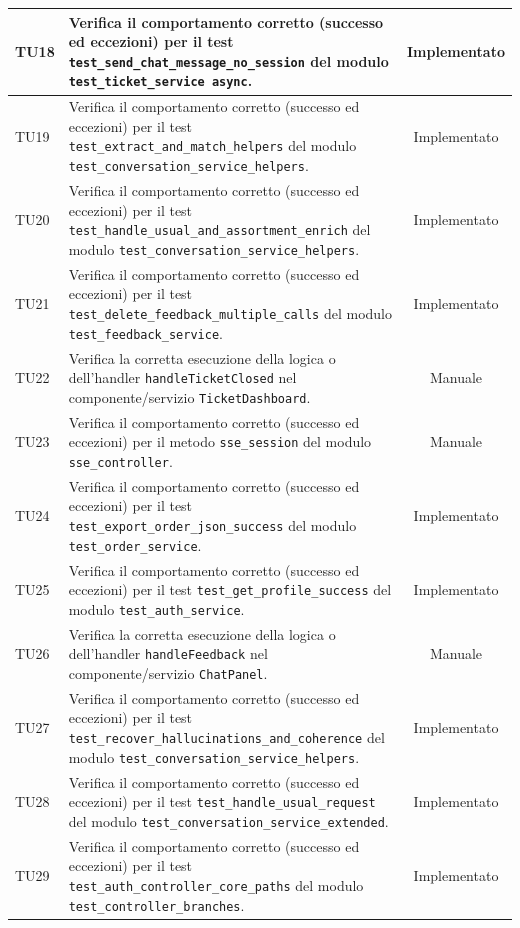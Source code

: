 \documentclass[a4paper,11pt,oneside]{scrartcl}
\begin{document}
\begin{longtable}{|p{1.9cm}|p{11.6cm}|c|}
    TU18 & Verifica il comportamento corretto (successo ed eccezioni) per il test \texttt{test\_send\_chat\_message\_no\_session} del modulo \texttt{test\_ticket\_service     async}. & Implementato \\ \hline
    TU19 & Verifica il comportamento corretto (successo ed eccezioni) per il test \texttt{test\_extract\_and\_match\_helpers} del modulo \texttt{test\_conversation\_service\_helpers}. & Implementato \\ \hline
    TU20 & Verifica il comportamento corretto (successo ed eccezioni) per il test \texttt{test\_handle\_usual\_and\_assortment\_enrich} del modulo \texttt{test\_conversation\_service\_helpers}. & Implementato \\ \hline
    TU21 & Verifica il comportamento corretto (successo ed eccezioni) per il test \texttt{test\_delete\_feedback\_multiple\_calls} del modulo \texttt{test\_feedback\_service}. & Implementato \\ \hline
    TU22 & Verifica la corretta esecuzione della logica o dell'handler \texttt{handleTicketClosed} nel componente/servizio \texttt{TicketDashboard}. & Manuale \\ \hline
    TU23 & Verifica il comportamento corretto (successo ed eccezioni) per il metodo \texttt{sse\_session} del modulo \texttt{sse\_controller}. & Manuale \\ \hline
    TU24 & Verifica il comportamento corretto (successo ed eccezioni) per il test \texttt{test\_export\_order\_json\_success} del modulo \texttt{test\_order\_service}. & Implementato \\ \hline
    TU25 & Verifica il comportamento corretto (successo ed eccezioni) per il test \texttt{test\_get\_profile\_success} del modulo \texttt{test\_auth\_service}. & Implementato \\ \hline
    TU26 & Verifica la corretta esecuzione della logica o dell'handler \texttt{handleFeedback} nel componente/servizio \texttt{ChatPanel}. & Manuale \\ \hline
    TU27 & Verifica il comportamento corretto (successo ed eccezioni) per il test \texttt{test\_recover\_hallucinations\_and\_coherence} del modulo \texttt{test\_conversation\_service\_helpers}. & Implementato \\ \hline
    TU28 & Verifica il comportamento corretto (successo ed eccezioni) per il test \texttt{test\_handle\_usual\_request} del modulo \texttt{test\_conversation\_service\_extended}. & Implementato \\ \hline
    TU29 & Verifica il comportamento corretto (successo ed eccezioni) per il test \texttt{test\_auth\_controller\_core\_paths} del modulo \texttt{test\_controller\_branches}. & Implementato \\ \hline

\end{longtable}
\end{document}
